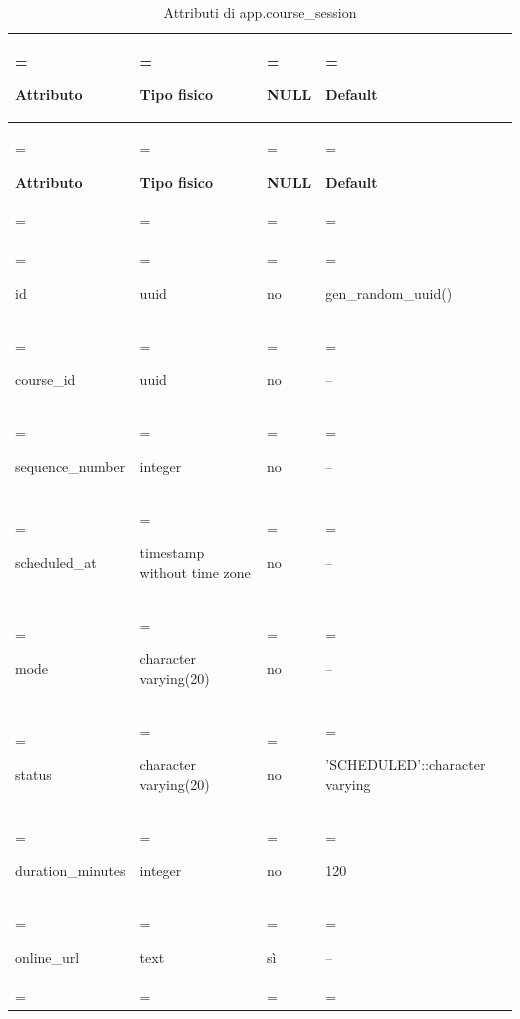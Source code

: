 \documentclass[11pt,a4paper]{article}
\begin{document}
{\small \renewcommand{\arraystretch}{1.2}

\begin{xltabular}{\linewidth}{>{\hsize\linewidth=\hsize\raggedright\arraybackslash}X>{\hsize\linewidth=\hsize\raggedright\arraybackslash}X>{\hsize\linewidth=\hsize\raggedright\arraybackslash}X>{\hsize\linewidth=\hsize\raggedright\arraybackslash}X}
\caption{Attributi di app.course\_session}\label{tab:dictionary-12}\\
\toprule

\textbf{Attributo} & \textbf{Tipo fisico} & \textbf{NULL} & \textbf{Default}\\\midrule\endfirsthead\toprule\textbf{Attributo} & \textbf{Tipo fisico} & \textbf{NULL} & \textbf{Default}\\\midrule\endhead
\midrule{}\\\endfoot\bottomrule\endlastfoot


{\ttfamily\small id} & {\ttfamily\small uuid} & no & {\ttfamily\small gen\_\allowbreak{}random\_\allowbreak{}uuid(\allowbreak{})}\\\addlinespace[3pt]

{\ttfamily\small course\_\allowbreak{}id} & {\ttfamily\small uuid} & no & {\ttfamily\small --}\\\addlinespace[3pt]

{\ttfamily\small sequence\_\allowbreak{}number} & {\ttfamily\small integer} & no & {\ttfamily\small --}\\\addlinespace[3pt]

{\ttfamily\small scheduled\_\allowbreak{}at} & {\ttfamily\small timestamp without time zone} & no & {\ttfamily\small --}\\\addlinespace[3pt]

{\ttfamily\small mode} & {\ttfamily\small character varying(\allowbreak{}20)} & no & {\ttfamily\small --}\\\addlinespace[3pt]

{\ttfamily\small status} & {\ttfamily\small character varying(\allowbreak{}20)} & no & {\ttfamily\small 'SCHEDULED'::character varying}\\\addlinespace[3pt]

{\ttfamily\small duration\_\allowbreak{}minutes} & {\ttfamily\small integer} & no & {\ttfamily\small 120}\\\addlinespace[3pt]

{\ttfamily\small online\_\allowbreak{}url} & {\ttfamily\small text} & sì & {\ttfamily\small --}\\\addlinespace[3pt]


\end{xltabular}}
\end{document}
